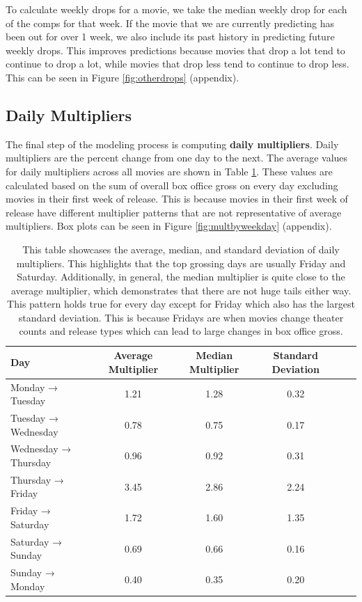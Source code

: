 \documentclass[12pt]{article}
\begin{document}
To calculate weekly drops for a movie, we take the median weekly drop for each of the comps for that week. If the movie that we are currently predicting has been out for over 1 week, we also include its past history in predicting future weekly drops. This improves predictions because movies that drop a lot tend to continue to drop a lot, while movies that drop less tend to continue to drop less. This can be seen in Figure \ref{fig:otherdrops} (appendix).

\subsection{Daily Multipliers}

The final step of the modeling process is computing \textbf{daily multipliers}. Daily multipliers are the percent change from one day to the next. The average values for daily multipliers across all movies are shown in Table \ref{tab:drops}. These values are calculated based on the sum of overall box office gross on every day excluding movies in their first week of release. This is because movies in their first week of release have different multiplier patterns that are not representative of average multipliers. Box plots can be seen in Figure \ref{fig:multbyweekday} (appendix).

\begin{table}[H]
    \centering
    \begin{tabular}{lccccc}
        \toprule
        Day & Average Multiplier & Median Multiplier & Standard Deviation \\
        \midrule
        Monday → Tuesday & 1.21 & 1.28 & 0.32 \\
        Tuesday → Wednesday & 0.78 & 0.75 & 0.17 \\
        Wednesday → Thursday & 0.96 & 0.92 & 0.31 \\
        Thursday → Friday & 3.45 & 2.86 & 2.24 \\
        Friday → Saturday & 1.72 & 1.60 & 1.35 \\
        Saturday → Sunday & 0.69 & 0.66 & 0.16 \\
        Sunday → Monday & 0.40 & 0.35 & 0.20 \\
        \bottomrule
    \end{tabular}
    \caption{This table showcases the average, median, and standard deviation of daily multipliers. This highlights that the top grossing days are usually Friday and Saturday. Additionally, in general, the median multiplier is quite close to the average multiplier, which demonstrates that there are not huge tails either way. This pattern holds true for every day except for Friday which also has the largest standard deviation. This is because Fridays are when movies change theater counts and release types which can lead to large changes in box office gross.}
    \label{tab:drops}
\end{table}
\end{document}
